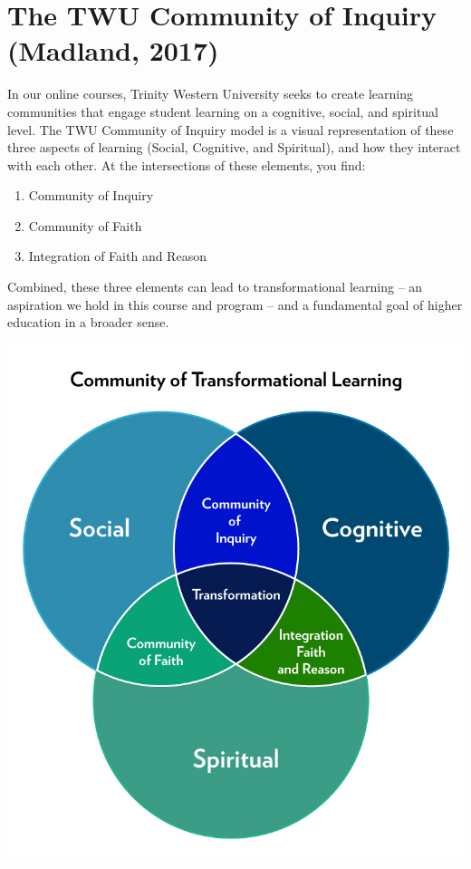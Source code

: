 \documentclass[
]{book}
\providecommand{\tightlist}{%
  \setlength{\itemsep}{0pt}\setlength{\parskip}{0pt}}
\begin{document}
\hypertarget{the-twu-community-of-inquiry-madland-2017}{%
\section{The TWU Community of Inquiry (Madland, 2017)}\label{the-twu-community-of-inquiry-madland-2017}}

In our online courses, Trinity Western University seeks to create learning communities that engage student learning on a cognitive, social, and spiritual level. The TWU Community of Inquiry model is a visual representation of these three aspects of learning (Social, Cognitive, and Spiritual), and how they interact with each other. At the intersections of these elements, you find:

\begin{enumerate}
\def\labelenumi{\arabic{enumi}.}
\tightlist
\item
  Community of Inquiry\\
\item
  Community of Faith\\
\item
  Integration of Faith and Reason
\end{enumerate}

Combined, these three elements can lead to transformational learning -- an aspiration we hold in this course and program -- and a fundamental goal of higher education in a broader sense.

\includegraphics{assets/unit4/community-of-transformational-learning.jpg}
\end{document}
